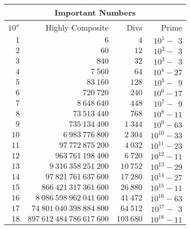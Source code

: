 \begin{tabularx}{\linewidth}{|r||r|r||r|}
	\hline
	\multicolumn{4}{|c|}{Important Numbers} \\
	\hline
	$10^x$ &          Highly Composite &      Divs &         Prime \\
	\hline
	   $1$ &                       $6$ &       $4$ &  $10^{1}-~~3$ \\
	   $2$ &                      $60$ &      $12$ &  $10^{2}-~~3$ \\
	   $3$ &                     $840$ &      $32$ &  $10^{3}-~~3$ \\
	   $4$ &                   $7~560$ &      $64$ &  $10^{4}- 27$ \\
	   $5$ &                  $83~160$ &     $128$ &  $10^{5}-~~9$ \\
	   $6$ &                 $720~720$ &     $240$ &  $10^{6}- 17$ \\
	   $7$ &               $8~648~640$ &     $448$ &  $10^{7}-~~9$ \\
	   $8$ &              $73~513~440$ &     $768$ &  $10^{8}- 11$ \\
	   $9$ &             $735~134~400$ &   $1~344$ &  $10^{9}- 63$ \\
	  $10$ &           $6~983~776~800$ &   $2~304$ & $10^{10}- 33$ \\
	  $11$ &          $97~772~875~200$ &   $4~032$ & $10^{11}- 23$ \\
	  $12$ &         $963~761~198~400$ &   $6~720$ & $10^{12}- 11$ \\
	  $13$ &       $9~316~358~251~200$ &  $10~752$ & $10^{13}- 29$ \\
	  $14$ &      $97~821~761~637~600$ &  $17~280$ & $10^{14}- 27$ \\
	  $15$ &     $866~421~317~361~600$ &  $26~880$ & $10^{15}- 11$ \\
	  $16$ &   $8~086~598~962~041~600$ &  $41~472$ & $10^{16}- 63$ \\
	  $17$ &  $74~801~040~398~884~800$ &  $64~512$ & $10^{17}-~~3$ \\
	  $18$ & $897~612~484~786~617~600$ & $103~680$ & $10^{18}- 11$ \\
	\hline
\end{tabularx}
